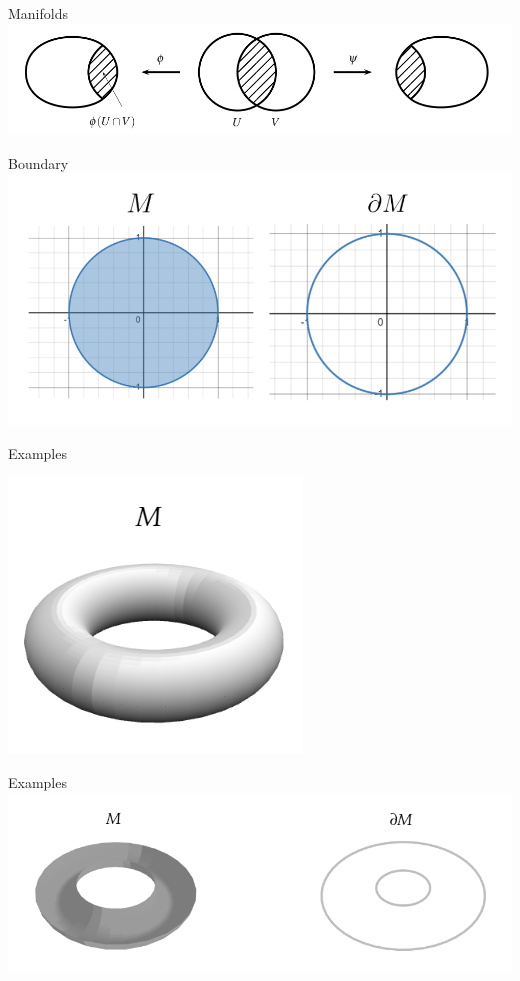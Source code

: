 \documentclass[9pt]{beamer}
\begin{document}
\begin{frame}{Manifolds}
    \includegraphics[scale=0.55]{compatible.PNG}

\end{frame}

\begin{frame}{Boundary}
    \includegraphics[scale=0.6]{boundary.PNG}
\end{frame}

\begin{frame}{Examples}
    \begin{center}  
    \includegraphics[scale=0.6]{torus.png}
    \end{center}
\end{frame}

\begin{frame}{Examples}
    \includegraphics[scale=0.6]{torus1.PNG}
\end{frame}
\end{document}
